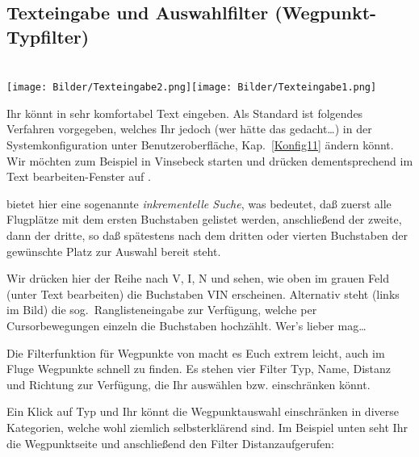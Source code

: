 \subsection{Texteingabe und Auswahlfilter (Wegpunkt-Typfilter)}\label{Texteingabe}\label{Filter}
\begin{center}
\blink~\blink~\blink~\blink~\\[1em]
 \texttt{[image: Bilder/Texteingabe2.png]}\qquad \texttt{[image: Bilder/Texteingabe1.png]}
\end{center}
Ihr könnt in \xc sehr komfortabel Text eingeben.  Als Standard ist folgendes Verfahren vorgegeben, welches Ihr jedoch (wer hätte das gedacht\dots) in der Systemkonfiguration unter Benutzeroberfläche, Kap.\  \ref{Konfig11} ändern könnt. Wir möchten zum Beispiel in \textsf{Vinsebeck} starten und drücken dementsprechend im Text bearbeiten-Fenster auf .

\xc bietet hier eine sogenannte\textsl{ inkrementelle Suche}, was bedeutet, daß zuerst alle Flugplätze mit
dem ersten Buchstaben gelistet werden, anschließend der zweite, dann der dritte, so daß spätestens nach
dem dritten oder vierten Buchstaben der gewünschte Platz zur Auswahl bereit steht.

Wir drücken hier der Reihe nach \textsf{V, I, N} und sehen, wie oben im grauen Feld  (unter \textsf{Text bearbeiten})
die Buchstaben \textsf{VIN} erscheinen.  Alternativ steht (links im Bild) die
sog.\ Ranglisteneingabe zur Verfügung, welche per Cursorbewegungen einzeln die Buchstaben hochzählt.
Wer's lieber mag\dots

Die Filterfunktion für Wegpunkte von \xc macht es Euch extrem leicht, auch im Fluge Wegpunkte schnell zu finden.
Es stehen vier Filter \textsf{Typ}, \textsf{Name}, \textsf{Distanz} und \textsf{Richtung} zur Verfügung, die Ihr auswählen bzw. einschränken könnt.

Ein Klick auf \textsf{Typ} und Ihr könnt die Wegpunktauswahl einschränken in diverse Kategorien, welche wohl ziemlich selbsterklärend sind. Im Beispiel unten seht Ihr die Wegpunktseite und anschließend den Filter \textsf{Distanz}aufgerufen:

